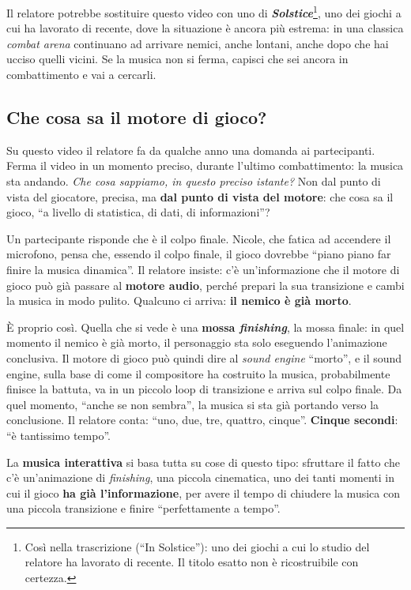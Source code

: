 Il relatore potrebbe sostituire questo video con uno di
\textbf{\emph{Solstice}}\footnote{Così nella trascrizione (``In Solstice''): uno
dei giochi a cui lo studio del relatore ha lavorato di recente. Il titolo esatto
non è ricostruibile con certezza.}, uno dei giochi a cui ha lavorato di recente,
dove la situazione è ancora più estrema: in una classica \emph{combat arena}
continuano ad arrivare nemici, anche lontani, anche dopo che hai ucciso quelli
vicini. Se la musica non si ferma, capisci che sei ancora in combattimento e vai
a cercarli.

\subsection{Che cosa sa il motore di gioco?}

Su questo video il relatore fa da qualche anno una domanda ai partecipanti.
Ferma il video in un momento preciso, durante l'ultimo combattimento: la musica
sta andando. \emph{Che cosa sappiamo, in questo preciso istante?} Non dal punto
di vista del giocatore, precisa, ma \textbf{dal punto di vista del motore}: che
cosa sa il gioco, ``a livello di statistica, di dati, di informazioni''?

Un partecipante risponde che è il colpo finale. Nicole, che fatica ad accendere
il microfono, pensa che, essendo il colpo finale, il gioco dovrebbe ``piano piano
far finire la musica dinamica''. Il relatore insiste: c'è un'informazione che il
motore di gioco può già passare al \textbf{motore audio}, perché prepari la sua
transizione e cambi la musica in modo pulito. Qualcuno ci arriva: \textbf{il
nemico è già morto}.

È proprio così. Quella che si vede è una \textbf{mossa \emph{finishing}}, la
mossa finale: in quel momento il nemico è già morto, il personaggio sta solo
eseguendo l'animazione conclusiva. Il motore di gioco può quindi dire al
\emph{sound engine} ``morto'', e il sound engine, sulla base di come il
compositore ha costruito la musica, probabilmente finisce la battuta, va in un
piccolo loop di transizione e arriva sul colpo finale. Da quel momento, ``anche
se non sembra'', la musica si sta già portando verso la conclusione. Il relatore
conta: ``uno, due, tre, quattro, cinque''. \textbf{Cinque secondi}: ``è
tantissimo tempo''.

La \textbf{musica interattiva} si basa tutta su cose di questo tipo: sfruttare
il fatto che c'è un'animazione di \emph{finishing}, una piccola cinematica, uno
dei tanti momenti in cui il gioco \textbf{ha già l'informazione}, per avere il
tempo di chiudere la musica con una piccola transizione e finire
``perfettamente a tempo''.

